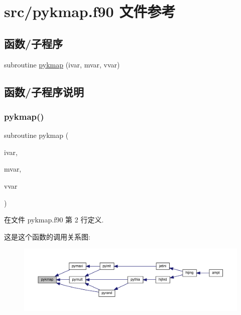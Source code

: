 \hypertarget{pykmap_8f90}{}\section{src/pykmap.f90 文件参考}
\label{pykmap_8f90}
\subsection*{函数/子程序}
\begin{DoxyCompactItemize}
\item 
subroutine \mbox{\hyperlink{pykmap_8f90_a27f2ae4c701c16cf0dc96b3c609526ba}{pykmap}} (ivar, mvar, vvar)
\end{DoxyCompactItemize}


\subsection{函数/子程序说明}
\mbox{\label{pykmap_8f90_a27f2ae4c701c16cf0dc96b3c609526ba}} 
\subsubsection{\texorpdfstring{pykmap()}{pykmap()}}
{\footnotesize\ttfamily subroutine pykmap (\begin{DoxyParamCaption}\item[{}]{ivar,  }\item[{}]{mvar,  }\item[{}]{vvar }\end{DoxyParamCaption})}



在文件 pykmap.\+f90 第 2 行定义.

这是这个函数的调用关系图\+:
\nopagebreak
\begin{figure}[H]
\begin{center}
\leavevmode
\includegraphics[width=350pt]{pykmap_8f90_a27f2ae4c701c16cf0dc96b3c609526ba_icgraph}
\end{center}
\end{figure}

